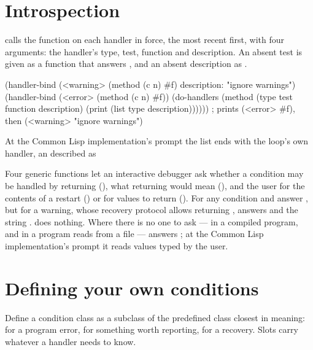 \section{Introspection}\label{sec:conditions-introspection}

 calls the function on each handler
in force, the most recent first, with four arguments: the handler's type,
test, function and description. An absent test is given as a function
that answers , and an absent description as .

\begin{dylan}
(handler-bind (<warning> (method (c n) #f) description: "ignore warnings")
  (handler-bind (<error> (method (c n) #f))
    (do-handlers (method (type test function description)
                   (print (list type description))))))
; prints (<error> #f), then (<warning> "ignore warnings")
\end{dylan}

\noindent At the Common Lisp implementation's prompt the list ends with
the loop's own handler, an  described as

Four generic functions let an interactive debugger ask whether a
condition may be handled by returning (), what
returning would mean (), and the user for the
contents of a restart () or for values to return
(). For any condition  and
 answer , but for a warning, whose
recovery protocol allows returning ,
 answers  and
 the string .  does nothing. Where there is no one to
ask --- in a compiled program, and in a program  reads
from a file ---  answers ; at the Common
Lisp implementation's prompt it reads values typed by the user.

\section{Defining your own conditions}\label{sec:conditions-defining}

Define a condition class as a subclass of the predefined class closest
in meaning:  for a program error,  for
something worth reporting,  for a recovery. Slots carry
whatever a handler needs to know.

